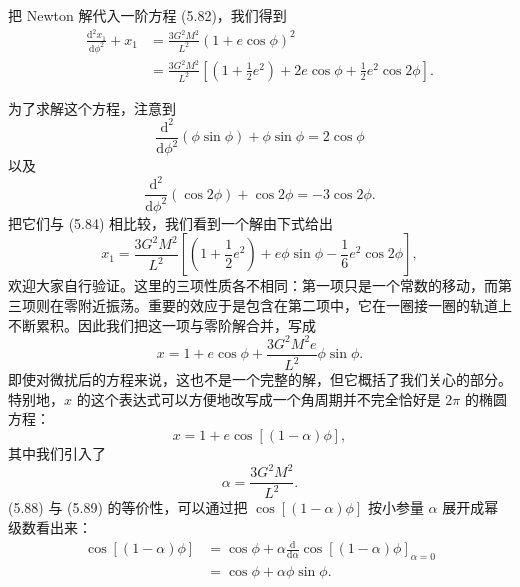 把 Newton 解代入一阶方程 (5.82)，我们得到
\begin{align*}
\frac{\mathrm{d}^2 x_1}{\mathrm{d}\phi^2} + x_1 &= \frac{3G^2M^2}{L^2}(1+e\cos\phi)^2\\
&= \frac{3G^2M^2}{L^2}\left[\left(1+\frac{1}{2}e^2\right) + 2e\cos\phi + \frac{1}{2}e^2\cos 2\phi\right].
\tag{5.84}
\end{align*}

为了求解这个方程，注意到
\begin{equation*}
\frac{\mathrm{d}^2}{\mathrm{d}\phi^2}(\phi\sin\phi) + \phi\sin\phi = 2\cos\phi
\tag{5.85}
\end{equation*}
以及
\begin{equation*}
\frac{\mathrm{d}^2}{\mathrm{d}\phi^2}(\cos 2\phi) + \cos 2\phi = -3\cos 2\phi.
\tag{5.86}
\end{equation*}
把它们与 (5.84) 相比较，我们看到一个解由下式给出
\begin{equation*}
x_1 = \frac{3G^2M^2}{L^2}\left[\left(1+\frac{1}{2}e^2\right) + e\phi\sin\phi - \frac{1}{6}e^2\cos 2\phi\right],
\tag{5.87}
\end{equation*}
欢迎大家自行验证。这里的三项性质各不相同：第一项只是一个常数的移动，而第三项则在零附近振荡。重要的效应于是包含在第二项中，它在一圈接一圈的轨道上不断累积。因此我们把这一项与零阶解合并，写成
\begin{equation*}
x = 1 + e\cos\phi + \frac{3G^2M^2e}{L^2}\phi\sin\phi.
\tag{5.88}
\end{equation*}
即使对微扰后的方程来说，这也不是一个完整的解，但它概括了我们关心的部分。特别地，$x$ 的这个表达式可以方便地改写成一个角周期并不完全恰好是 $2\pi$ 的椭圆方程：
\begin{equation*}
x = 1 + e\cos[(1-\alpha)\phi],
\tag{5.89}
\end{equation*}
其中我们引入了
\begin{equation*}
\alpha = \frac{3G^2M^2}{L^2}.
\tag{5.90}
\end{equation*}
(5.88) 与 (5.89) 的等价性，可以通过把 $\cos[(1-\alpha)\phi]$ 按小参量 $\alpha$ 展开成幂级数看出来：
\begin{align*}
\cos[(1-\alpha)\phi] &= \cos\phi + \alpha\frac{\mathrm{d}}{\mathrm{d}\alpha}\cos[(1-\alpha)\phi]_{\alpha=0}\\
&= \cos\phi + \alpha\phi\sin\phi.
\tag{5.91}
\end{align*}

